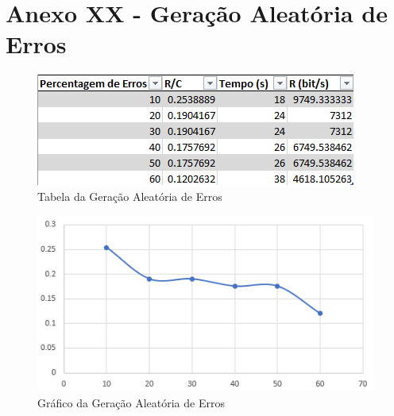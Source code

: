 \documentclass[article, a4paper, 11pt, oneside]{memoir}
\begin{document}
\section{Anexo XX - Geração Aleatória de Erros}

\begin{figure}[htbp]
  \centering        
  \includegraphics[scale=1]{img/percentagem_table.png}
  \caption{Tabela da Geração Aleatória de Erros}
\end{figure}

\begin{figure}[htbp]
  \centering        
  \includegraphics[scale=1]{img/percentagem.png}
  \caption{Gráfico da Geração Aleatória de Erros}
\end{figure}
\end{document}
